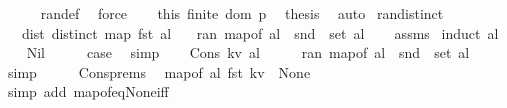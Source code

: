 \begin{isabellebody}
\ \ \ \ \isamarkupfalse%
\ ran{\isacharunderscore}{\kern0pt}def\ \isamarkupfalse%
\ force\isanewline
\ \ \isamarkupfalse%
\ this\ {\isacartoucheopen}finite\ {\isacharparenleft}{\kern0pt}dom\ p{\isacharparenright}{\kern0pt}{\isacartoucheclose}\ \isamarkupfalse%
\ {\isacharquery}{\kern0pt}thesis\ \isamarkupfalse%
\ auto\isanewline
{}\isamarkupfalse%
%
\endisatagproof
{\isafoldproof}%
%
\isadelimproof
\isanewline
%
\endisadelimproof
\isanewline
{}\isamarkupfalse%
\ ran{\isacharunderscore}{\kern0pt}distinct{\isacharcolon}{\kern0pt}\isanewline
\ \ \ dist{\isacharcolon}{\kern0pt}\ {\isachardoublequoteopen}distinct\ {\isacharparenleft}{\kern0pt}map\ fst\ al{\isacharparenright}{\kern0pt}{\isachardoublequoteclose}\isanewline
\ \ \ {\isachardoublequoteopen}ran\ {\isacharparenleft}{\kern0pt}map{\isacharunderscore}{\kern0pt}of\ al{\isacharparenright}{\kern0pt}\ {\isacharequal}{\kern0pt}\ snd\ {\isacharbackquote}{\kern0pt}\ set\ al{\isachardoublequoteclose}\isanewline
%
\isadelimproof
\ \ %
\endisadelimproof
%
\isatagproof
{}\isamarkupfalse%
\ assms\isanewline
{}\isamarkupfalse%
\ {\isacharparenleft}{\kern0pt}induct\ al{\isacharparenright}{\kern0pt}\isanewline
\ \ \isamarkupfalse%
\ Nil\isanewline
\ \ \isamarkupfalse%
\ \isamarkupfalse%
\ {\isacharquery}{\kern0pt}case\ \isamarkupfalse%
\ simp\isanewline
{}\isamarkupfalse%
\isanewline
\ \ \isamarkupfalse%
\ {\isacharparenleft}{\kern0pt}Cons\ kv\ al{\isacharparenright}{\kern0pt}\isanewline
\ \ \isamarkupfalse%
\ \isamarkupfalse%
\ {\isachardoublequoteopen}ran\ {\isacharparenleft}{\kern0pt}map{\isacharunderscore}{\kern0pt}of\ al{\isacharparenright}{\kern0pt}\ {\isacharequal}{\kern0pt}\ snd\ {\isacharbackquote}{\kern0pt}\ set\ al{\isachardoublequoteclose}\ \isamarkupfalse%
\ simp\isanewline
\ \ \isamarkupfalse%
\ \isamarkupfalse%
\ Cons{\isachardot}{\kern0pt}prems\ \isamarkupfalse%
\ {\isachardoublequoteopen}map{\isacharunderscore}{\kern0pt}of\ al\ {\isacharparenleft}{\kern0pt}fst\ kv{\isacharparenright}{\kern0pt}\ {\isacharequal}{\kern0pt}\ None{\isachardoublequoteclose}\isanewline
\ \ \ \ \isamarkupfalse%
\ {\isacharparenleft}{\kern0pt}simp\ add{\isacharcolon}{\kern0pt}\ map{\isacharunderscore}{\kern0pt}of{\isacharunderscore}{\kern0pt}eq{\isacharunderscore}{\kern0pt}None{\isacharunderscore}{\kern0pt}iff{\isacharparenright}{\kern0pt}\isanewline

\end{isabellebody}
